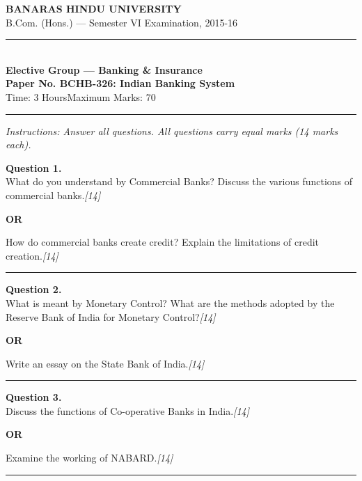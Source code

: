 \documentclass[11pt,a4paper]{article}
\newcommand{\pts}[1]{\hfill   \textit{[#1]}}
\begin{document}
\begin{center}
  {\large\bfseries BANARAS HINDU UNIVERSITY}\\[2pt]
  {\normalsize B.Com. (Hons.) --- Semester VI Examination, 2015-16}\\[6pt]
  \rule{0.8\linewidth}{0.5pt}\\[6pt]
  {\large\bfseries Elective Group --- Banking \& Insurance}\\[4pt]
  {\large\bfseries Paper No. BCHB-326: Indian Banking System}\\[4pt]
  {\normalsize Time: 3 Hours\hfill Maximum Marks: 70}
\end{center}

\rule{\linewidth}{0.4pt}

\smallskip



\noindent   \textit{Instructions: Answer all questions. All questions carry equal marks (14 marks each).}

\bigskip




\noindent   \textbf{Question 1.} \\
What do you understand by Commercial Banks? Discuss the various functions of commercial banks.\pts{14}

\centerline{   \textbf{OR}}

How do commercial banks create credit? Explain the limitations of credit creation.\pts{14}

\medskip\rule{\linewidth}{0.2pt}




\noindent   \textbf{Question 2.} \\
What is meant by Monetary Control? What are the methods adopted by the Reserve Bank of India for Monetary Control?\pts{14}

\centerline{   \textbf{OR}}

Write an essay on the State Bank of India.\pts{14}

\medskip\rule{\linewidth}{0.2pt}

\pagebreak




\noindent   \textbf{Question 3.} \\
Discuss the functions of Co-operative Banks in India.\pts{14}

\centerline{   \textbf{OR}}

Examine the working of NABARD.\pts{14}

\medskip\rule{\linewidth}{0.2pt}
\end{document}
